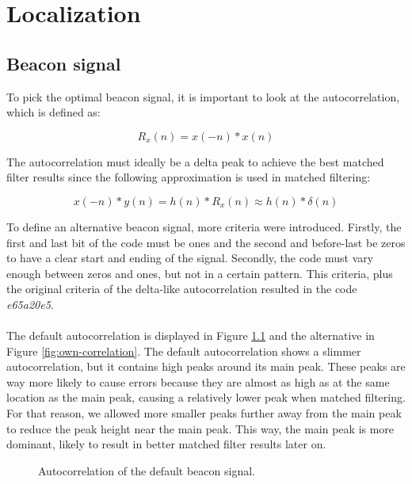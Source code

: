 \documentclass[final]{scrreprt} %
\begin{document}
\chapter{Localization}
\section{Beacon signal}
To pick the optimal beacon signal, it is important to look at the autocorrelation, which is defined as:

\begin{equation}
	R_x(n) = x(-n) * x(n)
\end{equation}

The autocorrelation must ideally be a delta peak to achieve the best matched filter results since the following approximation is used in matched filtering:

\begin{equation}
	x(-n) * y(n) = h(n) * R_x(n) \approx h(n) * \delta (n)
\end{equation}

To define an alternative beacon signal, more criteria were introduced.
Firstly, the first and last bit of the code must be ones and the second and before-last be zeros to have a clear start and ending of the signal.
Secondly, the code must vary enough between zeros and ones, but not in a certain pattern.
This criteria, plus the original criteria of the delta-like autocorrelation resulted in the code \emph{e65a20e5}.
\\ \\
The default autocorrelation is displayed in Figure \ref{fig:default-correlation} and the alternative in Figure \ref{fig:own-correlation}.
The default autocorrelation shows a slimmer autocorrelation, but it contains high peaks around its main peak.
These peaks are way more likely to cause errors because they are almost as high as at the same location as the main peak, causing a relatively lower peak when matched filtering.
For that reason, we allowed more smaller peaks further away from the main peak to reduce the peak height near the main peak.
This way, the main peak is more dominant, likely to result in better matched filter results later on.

\begin{figure}[H]
	\centering
	\setlength\figureheight{4cm}
    	\setlength{}
	
	\caption{Autocorrelation of the default beacon signal.}
	\label{fig:default-correlation}
\end{figure}
\end{document}
